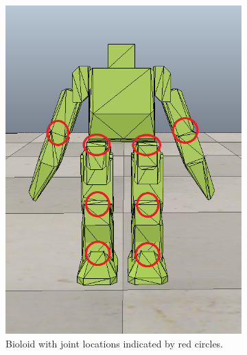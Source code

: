 \begin{figure}[H]
    \centering
    \begin{subfigure}[b]{0.5\textwidth}
        \centering
        \includegraphics[scale=0.50]{include/figure/Robot_Joints.PNG}
        \caption{Bioloid with joint locations indicated by red circles. }
        \label{fig:Robot_Joints}
    \end{subfigure}%
    ~ 
    \begin{subfigure}[b]{0.5\textwidth}
        \centering

\end{subfigure}
\end{figure}
